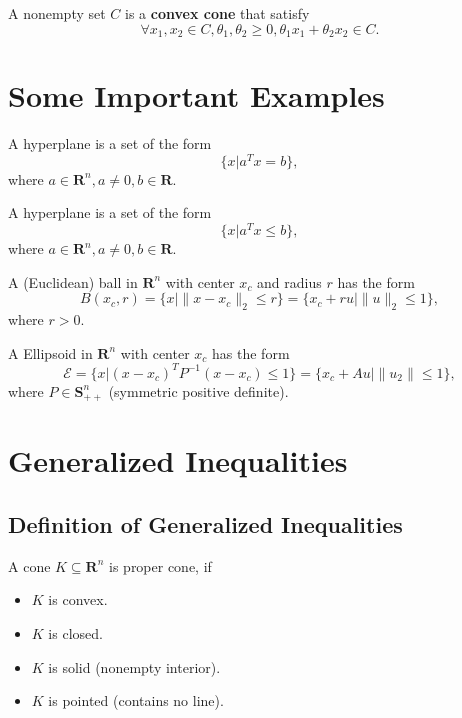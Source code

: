 \begin{definition}
    A nonempty set $C$ is a \textbf{convex cone} that satisfy $$\forall x_1,x_2\in C, \theta_1,\theta_2\geq 0,\theta_1 x_1+\theta_2 x_2\in C.$$
\end{definition}

\section{Some Important Examples}

\begin{definition}[Hyperplane]
    A hyperplane is a set of the form $$\{x|a^Tx=b\},$$ where $a\in\mathbf{R}^n,a\neq 0,b\in\mathbf{R}$.
\end{definition}

\begin{definition}[Halfspace]
    A hyperplane is a set of the form $$\{x|a^Tx\leq b\},$$ where $a\in\mathbf{R}^n,a\neq 0,b\in\mathbf{R}$.
\end{definition}

\begin{definition}
    A (Euclidean) ball in $\mathbf{R}^n$ with center $x_c$ and radius $r$ has the form $$B(x_c,r)=\{x\vert\|x-x_c\|_2\leq r\}=\{x_c+ru\vert\|u\|_2\leq 1\},$$ where $r>0$.
\end{definition}

\begin{definition}[Ellipsoid]
    A Ellipsoid in $\mathbf{R}^n$ with center $x_c$ has the form $$\mathcal{E}=\{x\vert(x-x_c)^TP^{-1}(x-x_c)\leq 1\}=\{x_c+Au\vert \|u_2\|\leq 1\},$$ where $P\in\mathbf{S}^{n}_{++}$ (symmetric positive definite).
\end{definition}

\section{Generalized Inequalities}

\subsection{Definition of Generalized Inequalities}

\begin{definition} \label{def:proper-cone}
    A cone $K\subseteq\mathbf{R}^n$ is proper cone, if
    \begin{itemize}
        \item $K$ is convex.
        \item $K$ is closed.
        \item $K$ is solid (nonempty interior).
        \item $K$ is pointed (contains no line).
    \end{itemize}
\end{definition}

